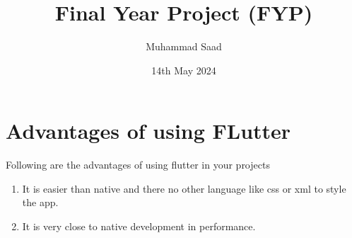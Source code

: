 \documentclass{article}
\title{Final Year Project (FYP)}
\date{14th May 2024}
\author{Muhammad Saad}
\begin{document}
	\maketitle
	\newpage
	\section{Advantages of using FLutter}
		Following are the advantages of using flutter in your projects
	\begin{enumerate}
	\subsection{Code}
		It will save a company alot of money because they don't have to hire for each platform. 
		\item It is easier than native and there no other language like css or xml to style the app.
		\item It is very close to native development in performance.
	\end{enumerate}
\end{document}
